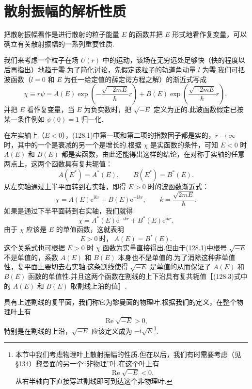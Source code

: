 \section{散射振幅的解析性质}

把散射振幅看作是进行散射的粒子能量 $E$ 的函数并把 $E$ 形式地看作复变量，可以确立有关散射振幅的一系列重要性质.

我们来考虑一个粒子在场 $U(r)$ 中的运动，该场在无穷远处足够快（快的程度以后再指出）地趋于零.为了简化讨论，先假定该粒子的轨道角动量 $l$ 为零.我们可把波函数（$l=0$ 和 $E$ 为任一给定值的薛定谔方程之解）的渐近式写成
\begin{equation}
  \chi\equiv r\psi=A(E)\exp\left(-\frac{\sqrt{-2mE}}{\hbar}r\right)
  +B(E)\exp\left(\frac{\sqrt{-2mE}}{\hbar}r\right),
\end{equation}
并把 $E$ 看作复变量，当 $E$ 为负实数时，把 $\sqrt{-E}$ 定义为正的.此波函数假定已按某一条件例如 $\psi(0)=1$ 归一化.

在左实轴上（$E<0$），(128.1)中第一项和第二项的指数因子都是实的，$r\to\infty$ 时，其中的一个是衰减的另一个是增长的.根据 $\chi$ 是实函数的条件，可知 $E<0$ 时 $A(E)$ 和 $B(E)$ 都是实函数，由此还能得出这样的结论，在对称于实轴的任意两点上，这两个函数具有复共轭值：
\begin{equation}
  A(E^{*})=A^{*}(E),\qquad B(E^{*})=B^{*}(E).
\end{equation}
从左实轴通过上半平面转到右实轴，即得 $E>0$ 时的波函数渐近式：
\begin{equation}
  \chi=A(E)\mathrm{e}^{\mathrm{i}kr}+B(E)\mathrm{e}^{-\mathrm{i}kr},
  \qquad k=\frac{\sqrt{2mE}}{\hbar}.
\end{equation}
如果是通过下半平面转到右实轴，我们就得
\begin{equation*}
  \chi=A^{*}(E)\mathrm{e}^{-\mathrm{i}kr}+B^{*}(E)\mathrm{e}^{\mathrm{i}kr}.
\end{equation*}
由于 $\chi$ 应该是 $E$ 的单值函数，这就表明
\begin{equation}
  E>0\ \text{时，}\ A(E)=B^{*}(E).
\end{equation}
这个关系式也可根据 $E>0$ 时 $\chi$ 函数为实量直接得出.但由于(128.1)中根号 $\sqrt{-E}$ 不是单值的，系数 $A(E)$ 和 $B(E)$ 本身也不是单值的.为了消除这种非单值性，复平面上要切去右实轴.这条割线使得 $\sqrt{-E}$ 是单值的从而保证了 $A(E)$ 和 $B(E)$ 函数的单值性.并且这两个函数在割线的上下沿具有复共轭值［(128.3)式中的 $A(E)$ 和 $B(E)$ 取割线上沿的值］.

具有上述割线的复平面，我们称它为黎曼面的物理叶.根据我们的定义，在整个物理叶上有
\begin{equation}
  \operatorname{Re}\sqrt{-E}>0,
\end{equation}
特别是在割线的上沿，$\sqrt{-E}$ 应该定义成为 $-\mathrm{i}\sqrt{E}$\footnote{本节中我们考虑物理叶上散射振幅的性质.但在以后，我们有时需要考虑（见§134）黎曼面的另一个“非物理”叶.在这个叶上有
\begin{equation*}
  \operatorname{Re}\sqrt{-E}<0.
  \tag{128.5a}
\end{equation*}
从右半轴向下直接穿过割线即可到达这个非物理叶.}.

